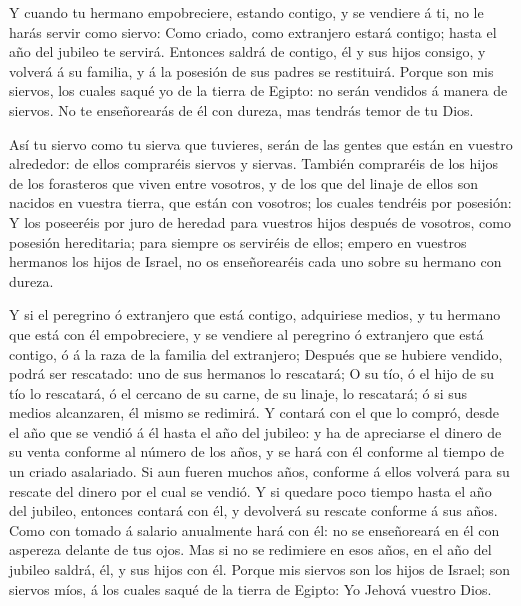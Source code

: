  Y cuando tu hermano empobreciere, estando contigo, y se
vendiere á ti, no le harás servir como siervo:  Como
criado, como extranjero estará contigo; hasta el año del jubileo te
servirá.  Entonces saldrá de contigo, él y sus hijos
consigo, y volverá á su familia, y á la posesión de sus padres se
restituirá.  Porque son mis siervos, los cuales saqué yo
de la tierra de Egipto: no serán vendidos á manera de siervos.
 No te enseñorearás de él con dureza, mas tendrás temor
de tu Dios.

 Así tu siervo como tu sierva que tuvieres, serán de las
gentes que están en vuestro alrededor: de ellos compraréis siervos y
siervas.  También compraréis de los hijos de los
forasteros que viven entre vosotros, y de los que del linaje de ellos
son nacidos en vuestra tierra, que están con vosotros; los cuales
tendréis por posesión:  Y los poseeréis por juro de
heredad para vuestros hijos después de vosotros, como posesión
hereditaria; para siempre os serviréis de ellos; empero en vuestros
hermanos los hijos de Israel, no os enseñorearéis cada uno sobre su
hermano con dureza.

 Y si el peregrino ó extranjero que está contigo,
adquiriese medios, y tu hermano que está con él empobreciere, y se
vendiere al peregrino ó extranjero que está contigo, ó á la raza de la
familia del extranjero;  Después que se hubiere vendido,
podrá ser rescatado: uno de sus hermanos lo rescatará;  O
su tío, ó el hijo de su tío lo rescatará, ó el cercano de su carne, de
su linaje, lo rescatará; ó si sus medios alcanzaren, él mismo se
redimirá.  Y contará con el que lo compró, desde el año
que se vendió á él hasta el año del jubileo: y ha de apreciarse el
dinero de su venta conforme al número de los años, y se hará con él
conforme al tiempo de un criado asalariado.  Si aun
fueren muchos años, conforme á ellos volverá para su rescate del dinero
por el cual se vendió.  Y si quedare poco tiempo hasta el
año del jubileo, entonces contará con él, y devolverá su rescate
conforme á sus años.  Como con tomado á salario
anualmente hará con él: no se enseñoreará en él con aspereza delante de
tus ojos.  Mas si no se redimiere en esos años, en el año
del jubileo saldrá, él, y sus hijos con él.  Porque mis
siervos son los hijos de Israel; son siervos míos, á los cuales saqué de
la tierra de Egipto: Yo Jehová vuestro Dios.

